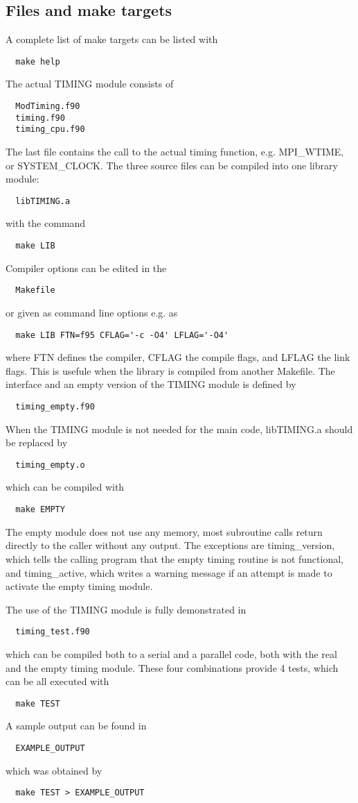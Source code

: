 \documentclass[10pt]{article}
\begin{document}
\newpage
\subsection{Files and make targets}

A complete list of make targets can be listed with
\begin{verbatim}
  make help
\end{verbatim}
The actual TIMING module consists of
\begin{verbatim}
  ModTiming.f90
  timing.f90
  timing_cpu.f90
\end{verbatim}
The last file contains the call to the actual timing function,
e.g. MPI\_WTIME, or SYSTEM\_CLOCK.
The three source files can be compiled into one library module:
\begin{verbatim}
  libTIMING.a
\end{verbatim}
with the command
\begin{verbatim}
  make LIB
\end{verbatim}
Compiler options can be edited in the 
\begin{verbatim}
  Makefile
\end{verbatim}
or given as command line options e.g. as
\begin{verbatim}
  make LIB FTN=f95 CFLAG='-c -O4' LFLAG='-O4'
\end{verbatim}
where FTN defines the compiler, CFLAG the compile flags, and LFLAG the
link flags. This is usefule when the library is compiled from another
Makefile. The interface and an empty version of the TIMING module
is defined by
\begin{verbatim}
  timing_empty.f90
\end{verbatim}
When the TIMING module is not needed for the main code, 
libTIMING.a should be replaced by
\begin{verbatim}
  timing_empty.o
\end{verbatim}
which can be compiled with
\begin{verbatim}
  make EMPTY
\end{verbatim}
The empty module does not use any memory, most subroutine calls 
return directly to the caller without any output. The exceptions
are timing\_version, which tells the calling program that the
empty timing routine is not functional, and timing\_active, which
writes a warning message if an attempt is made to activate 
the empty timing module.

The use of the TIMING module is fully demonstrated in 
\begin{verbatim}
  timing_test.f90
\end{verbatim}
which can be compiled both to a serial and a parallel code, both with
the real and the empty timing module. These four combinations
provide 4 tests, which can be all executed with
\begin{verbatim}
  make TEST
\end{verbatim}
A sample output can be found in
\begin{verbatim}
  EXAMPLE_OUTPUT
\end{verbatim}
which was obtained by
\begin{verbatim}
  make TEST > EXAMPLE_OUTPUT
\end{verbatim}
\end{document}
